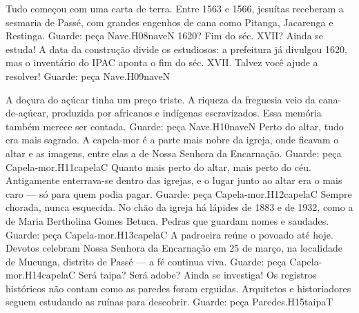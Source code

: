 {
{Tudo começou com uma carta de terra.}
{Entre 1563 e 1566, jesuítas receberam a sesmaria de Passé, com grandes engenhos de cana como Pitanga, Jacarenga e Restinga.}
{Guarde: peça Nave.}{H08}{nave}{N}}
{
{1620? Fim do séc. XVII? Ainda se estuda!}
{A data da construção divide os estudiosos: a prefeitura já divulgou 1620, mas o inventário do IPAC aponta o fim do séc. XVII. Talvez você ajude a resolver!}
{Guarde: peça Nave.}{H09}{nave}{N}}
\newpage

\linhacartas
{
{A doçura do açúcar tinha um preço triste.}
{A riqueza da freguesia veio da cana-de-açúcar, produzida por africanos e indígenas escravizados. Essa memória também merece ser contada.}
{Guarde: peça Nave.}{H10}{nave}{N}}
{
{Perto do altar, tudo era mais sagrado.}
{A capela-mor é a parte mais nobre da igreja, onde ficavam o altar e as imagens, entre elas a de Nossa Senhora da Encarnação.}
{Guarde: peça Capela-mor.}{H11}{capela}{C}}
{
{Quanto mais perto do altar, mais perto do céu.}
{Antigamente enterrava-se dentro das igrejas, e o lugar junto ao altar era o mais caro --- só para quem podia pagar.}
{Guarde: peça Capela-mor.}{H12}{capela}{C}}
\linhacartas
{
{Sempre chorada, nunca esquecida.}
{No chão da igreja há lápides de 1883 e de 1932, como a de Maria Bertholina Gomes Betuca. Pedras que guardam nomes e saudades.}
{Guarde: peça Capela-mor.}{H13}{capela}{C}}
{
{A padroeira reúne o povoado até hoje.}
{Devotos celebram Nossa Senhora da Encarnação em 25 de março, na localidade de Mucunga, distrito de Passé --- a fé continua viva.}
{Guarde: peça Capela-mor.}{H14}{capela}{C}}
{
{Será taipa? Será adobe? Ainda se investiga!}
{Os registros históricos não contam como as paredes foram erguidas. Arquitetos e historiadores seguem estudando as ruínas para descobrir.}
{Guarde: peça Paredes.}{H15}{taipa}{T}}
